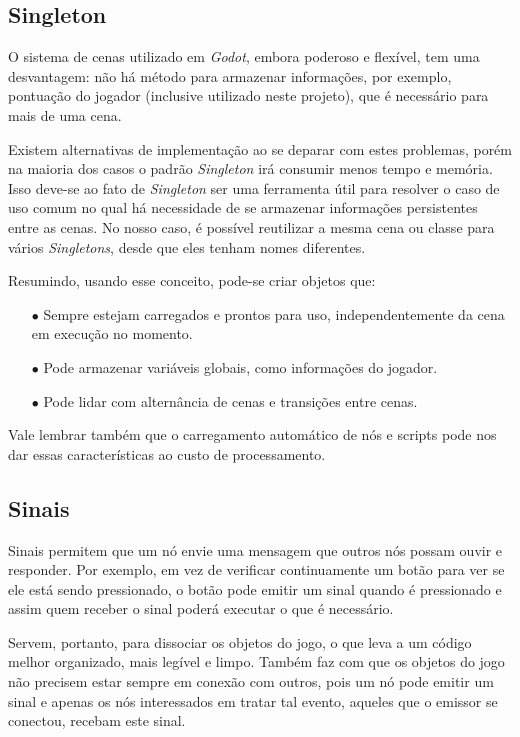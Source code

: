 \subsection{Singleton}

O sistema de cenas utilizado em \textit{Godot}, embora poderoso e flexível, tem 
uma desvantagem: não há método para armazenar informações, por exemplo, 
pontuação do jogador (inclusive utilizado neste projeto), que é necessário para 
mais de uma cena.

Existem alternativas de implementação ao se deparar com estes problemas, porém
na maioria dos casos o padrão \textit{Singleton} irá consumir menos tempo e
memória. Isso deve-se ao fato de \textit{Singleton} ser uma ferramenta útil para
resolver o caso de uso comum no qual há necessidade de se armazenar informações 
persistentes entre as cenas. No nosso caso, é possível reutilizar a mesma cena 
ou classe para vários \textit{Singletons}, desde que eles tenham 
nomes diferentes.

Resumindo, usando esse conceito, pode-se criar objetos que:

\begin{itemize}
    \item[$\bullet$]
        Sempre estejam carregados e prontos para uso, independentemente da cena 
        em execução no momento.
    \item[$\bullet$]
        Pode armazenar variáveis globais, como informações do jogador.
    \item[$\bullet$]
        Pode lidar com alternância de cenas e transições entre cenas.
\end{itemize}

Vale lembrar também que o carregamento automático de nós e scripts pode nos dar 
essas características ao custo de processamento.

\subsection{Sinais}

Sinais permitem que um nó envie uma mensagem que outros nós possam ouvir e 
responder. Por exemplo, em vez de verificar continuamente um botão para ver se 
ele está sendo pressionado, o botão pode emitir um sinal quando é pressionado e
assim quem receber o sinal poderá executar o que é necessário.

Servem, portanto, para dissociar os objetos do jogo, o que leva a um código 
melhor organizado, mais legível e limpo. Também faz com que os objetos do jogo
não precisem estar sempre em conexão com outros, pois um nó pode emitir um sinal
e apenas os nós interessados em tratar tal evento, aqueles que o emissor se
conectou, recebam este sinal.

